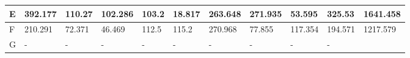 \begin{landscape}
\begin{longtable}[c]{|l|llllllllll|}
  E                                                                               & \multicolumn{1}{l|}{392.177}                                                        & \multicolumn{1}{l|}{110.27}                                                         & \multicolumn{1}{l|}{102.286}                                                        & \multicolumn{1}{l|}{103.2}                                                          & \multicolumn{1}{l|}{18.817}                                                         & \multicolumn{1}{l|}{263.648}                                                        & \multicolumn{1}{l|}{271.935}                                   & \multicolumn{1}{l|}{53.595}                                    & \multicolumn{1}{l|}{325.53}                                        & 1641.458                                                                               \\ \hline
  F                                                                               & \multicolumn{1}{l|}{210.291}                                                        & \multicolumn{1}{l|}{72.371}                                                         & \multicolumn{1}{l|}{46.469}                                                         & \multicolumn{1}{l|}{112.5}                                                          & \multicolumn{1}{l|}{115.2}                                                          & \multicolumn{1}{l|}{270.968}                                                        & \multicolumn{1}{l|}{77.855}                                    & \multicolumn{1}{l|}{117.354}                                   & \multicolumn{1}{l|}{194.571}                                       & 1217.579                                                                               \\ \hline
  G                                                                               & \multicolumn{1}{l|}{-}                                                              & \multicolumn{1}{l|}{-}                                                              & \multicolumn{1}{l|}{-}                                                              & \multicolumn{1}{l|}{-}                                                              & \multicolumn{1}{l|}{-}                                                              & \multicolumn{1}{l|}{-}                                                              & \multicolumn{1}{l|}{-}                                         & \multicolumn{1}{l|}{-}                                         & \multicolumn{1}{l|}{-}                                             &                                                                                        \\ \hline

\end{longtable}
\end{landscape}
